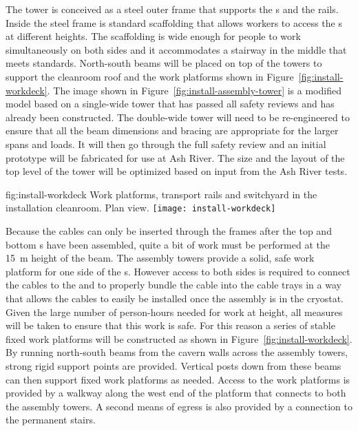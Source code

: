 The  tower is conceived as a steel outer frame that supports the s and the rails. Inside the steel frame is standard scaffolding that  %
allows workers to access the s at different heights. 
The scaffolding is wide enough for people to work simultaneously %
on both sides 
and it accommodates a stairway in the middle that meets  standards. 
North-south beams will be placed on top of the towers to support the cleanroom roof and the work platforms shown in Figure~\ref{fig:install-workdeck}.
The image shown in Figure~\ref{fig:install-assembly-tower} is a modified model based on a single-wide  tower that has passed all safety reviews and has already been constructed. 
The double-wide tower will need to be re-engineered to ensure that all the beam dimensions and bracing are appropriate for the larger spans and loads. 
It will then go %
through the full safety review and %
an initial prototype %
will be fabricated for use at Ash River. 
The size and the layout of the top level of the tower will be optimized based on input from the Ash River tests. 


\begin{dunefigure}{fig:install-workdeck}
  {Work platforms, transport rails and switchyard in the installation cleanroom. Plan view.  }
\texttt{[image: install-workdeck]}
\end{dunefigure}

Because the cables can only be inserted through the  frames after the top and bottom s %
have been assembled, quite a bit %
of work must be performed at the \SI{15}{m} height of the  beam. 
The  assembly towers %
provide a solid, safe work platform for one side of the s. 
However access to both sides is required to connect the cables to the  and to properly bundle the cable into the cable trays in a way that allows the cables to easily be installed once the assembly is in the cryostat. 
Given the large number of person-hours needed for work at height, all measures %
will be taken to ensure that this work is safe. %
For this reason a series of stable fixed work platforms will be constructed as shown in Figure~\ref{fig:install-workdeck}.
By running north-south beams from the cavern walls across the assembly towers, strong rigid support points are provided. 
Vertical posts down from these beams can then support fixed work platforms as needed. Access to the work platforms is provided by a walkway along the west end of the platform that connects to both the assembly towers. A second means of egress is also provided by a connection to the permanent stairs. 




